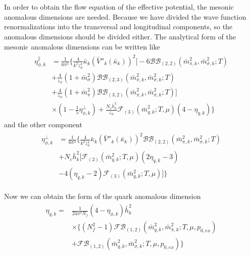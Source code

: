 \documentclass[%
reprint,
superscriptaddress,
showpacs,preprintnumbers,
 amsmath,amssymb,
 aps,
prd,
]{revtex4-1}
\begin{document}
\section{}
In order to obtain the flow equation of the effective potential, the mesonic anomalous dimensions are needed. Because 
we have divided the wave function renormalizations into the transversal and longitudinal components, so the 
anomalous dimensions should be divided either.
The analytical form of the mesonic anomalous dimensions can be written like
\begin{align}
\begin{split}
\eta_{\phi,k}^{\|}
&=\frac{1}{6\pi^2}\bigg\{ 
 \frac{4}{k^2z_\phi^4}\bar{\kappa}_k(\bar{V}''_k(\bar{\kappa}_k))^2\bigg[ 
 -6\mathcal{BB}_{(2,2)}(\bar{m}^{2}_{\pi,k},\bar{m}^{2}_{\sigma,k};T)\\
&+\frac{4}{z_\phi}(1+\bar{m}^{2}_{\sigma}){\mathcal{BB}}_{(2,3)}(\bar{m}^{2}_{\pi,k},\bar{m}^{2}_{\sigma,k};T)\\
&+\frac{4}{z_\phi}(1+\bar{m}^{2}_{\pi}){\mathcal{BB}}_{(3,2)}(\bar{m}^{2}_{\pi,k},\bar{m}^{2}_{\sigma,k};T)\bigg]\\
&\times(1-\frac{1}{5}\eta^{\bot}_{\phi,k})+\frac{N_c\bar{h}^{2}_{k}}{z_\phi}\mathcal{F}_{(3)}(\bar{m}^{2}_{q,k};T,\mu)(4-\eta_{q,k})\bigg\}   
\end{split}
\end{align} 
and the other component
\begin{align}
\begin{split}
\eta_{\phi,k}^{\bot}
&=\frac{1}{6\pi^2}\bigg\{ 
\frac{4}{k^2z_\phi^4}\bar{\kappa}_k(\bar{V}''_k(\bar{\kappa}_k))^2 \mathcal{BB}_{(2,2)}(\bar{m}^{2}_{\pi,k},\bar{m}^{2}_{\sigma,k};T)
\\&+N_c\bar{h}^{2}_{k}\bigg[\mathcal{F}_{(2)}(\bar{m}^{2}_{q,k};T,\mu)(2\eta_{q,k}-3)\\
&-4(\eta_{q,k}-2)\mathcal{F}_{(3)}(\bar{m}^2_{q,k};T,\mu)\bigg]
\bigg\}   
\end{split}
\end{align} 



Now we can obtain the form of the quark anomalous dimension
\begin{align}
\begin{split}
\eta_{q,k}=&\frac{1}{24\pi^2N_f}(4-\eta_{\phi,k})\bar{h}^{2}_{k}\\
&\times\bigg\{ (N^{2}_{f}-1)\mathcal{FB}_{(1,2)}(\bar{m}^{2}_{q,k},\bar{m}^{2}_{\pi,k};T,\mu,p_{0,ex})\\
&+\mathcal{FB}_{(1,2)}(\bar{m}^{2}_{q,k},\bar{m}^{2}_{\sigma,k};T,\mu,p_{0,ex}) \bigg\}
\end{split}
\end{align} 
\end{document}

